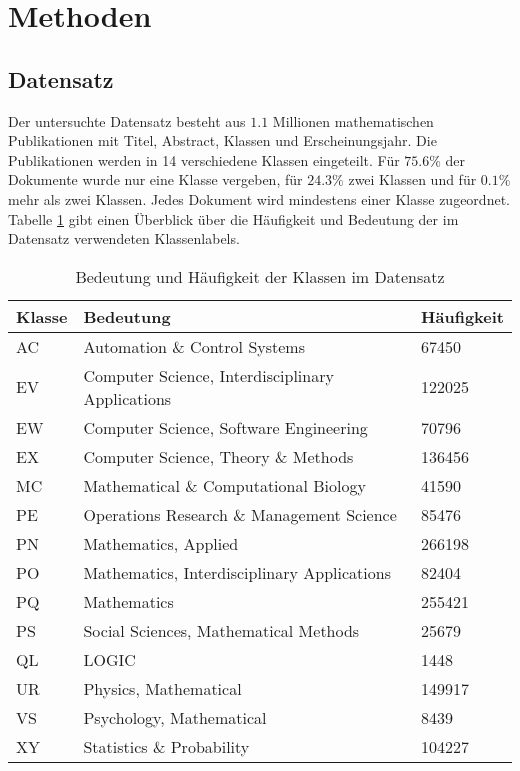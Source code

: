 \section{Methoden}


\subsection{Datensatz}
\label{sub:datensatz}
Der untersuchte Datensatz besteht aus $1.1$ Millionen mathematischen Publikationen mit Titel, Abstract, Klassen und Erscheinungsjahr.
Die Publikationen werden in 14 verschiedene Klassen eingeteilt.
Für $75.6 \%$ der Dokumente wurde nur eine Klasse vergeben, für $24.3 \%$ zwei Klassen und für $0.1 \%$ mehr als zwei Klassen.
Jedes Dokument wird mindestens einer Klasse zugeordnet.
Tabelle \ref{tab:class_meaning} gibt einen Überblick über die Häufigkeit und Bedeutung der im Datensatz verwendeten Klassenlabels.


\begin{table}[h]
    \centering
    \begin{tabular}{l|l|l}
        \textbf{Klasse} & \textbf{Bedeutung} & \textbf{Häufigkeit}\\
        \hline
        AC & Automation \& Control Systems & 67450\\
        EV & Computer Science, Interdisciplinary Applications & 122025\\
        EW & Computer Science, Software Engineering & 70796\\
        EX & Computer Science, Theory \& Methods & 136456\\
        MC & Mathematical \& Computational Biology & 41590\\
        PE & Operations Research \& Management Science & 85476\\
        PN & Mathematics, Applied & 266198\\
        PO & Mathematics, Interdisciplinary Applications & 82404\\
        PQ & Mathematics & 255421\\
        PS & Social Sciences, Mathematical Methods & 25679\\
        QL & LOGIC & 1448\\
        UR & Physics, Mathematical & 149917\\
        VS & Psychology, Mathematical & 8439\\
        XY & Statistics \& Probability & 104227\\
    \end{tabular}
    \caption{Bedeutung und Häufigkeit der Klassen im Datensatz}
    \label{tab:class_meaning}
\end{table}



